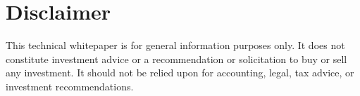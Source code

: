 \documentclass[11pt,a4paper]{article}
\begin{document}







\section{Disclaimer}

This technical whitepaper is for general information purposes only. It does not constitute investment advice or a recommendation or solicitation to buy or sell any investment. It should not be relied upon for accounting, legal, tax advice, or investment recommendations.
\end{document}
